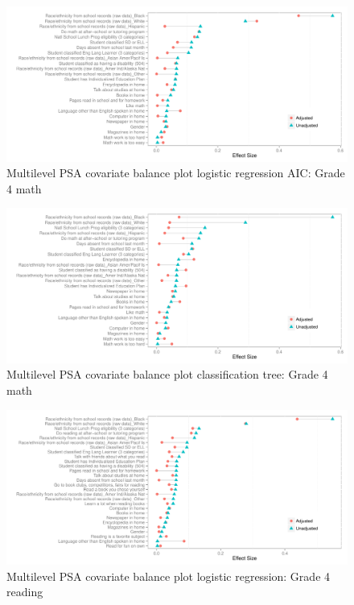 \begin{figure}[h!]
\begin{center}
\includegraphics[width=\textwidth]{../Figures2009/g4math-mlpsa-lrAIC-balance.pdf}
\caption{Multilevel PSA covariate balance plot logistic regression AIC: Grade 4 math}
\end{center}
\end{figure}

\begin{figure}[h!]
\begin{center}
\includegraphics[width=\textwidth]{../Figures2009/g4math-mlpsa-ctree-balance.pdf}
\caption{Multilevel PSA covariate balance plot classification tree: Grade 4 math}
\end{center}
\end{figure}

\begin{figure}[h!]
\begin{center}
\includegraphics[width=\textwidth]{../Figures2009/g4read-mlpsa-lr-balance.pdf}
\caption{Multilevel PSA covariate balance plot logistic regression: Grade 4 reading}
\end{center}
\end{figure}

